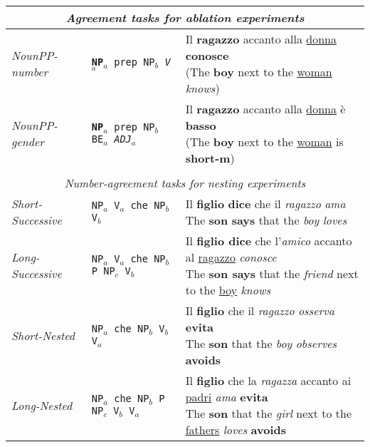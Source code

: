 \begin{table}[ht]
    \setlength\tabcolsep{3mm}
\small
\centering
\begin{tabular}{lll}
\multicolumn{3}{c}{\centering \textit{Agreement tasks for ablation experiments}}\\
\hline
\hline
\emph{NounPP-number} & \texttt{\textbf{NP$_a$} prep NP$_b$ \emph{V$_a$}} & \specialcell{Il \textbf{ragazzo} accanto alla \underline{donna} \textbf{conosce}\vspace{-1mm}\\({\scriptsize The \textbf{boy} next to the \underline{woman} \emph{knows}})} \\
\emph{NounPP-gender} & \texttt{\textbf{NP$_a$} prep NP$_b$ BE$_a$ \emph{ADJ$_a$}} & \specialcell{Il \textbf{ragazzo} accanto alla \underline{donna} \`{e} \textbf{basso}\vspace{-1mm}\\({\scriptsize The \textbf{boy} next to the \underline{woman} is \textbf{short-m}})}\\
\vspace{-2mm}\\
\multicolumn{3}{c}{\centering \textit{Number-agreement tasks for nesting experiments}}\\
\hline
\hline
\emph{Short-Successive} & \texttt{NP$_a$ V$_a$ che NP$_b$ V$_b$} & \specialcell{Il \textbf{figlio} \textbf{dice} che il \emph{ragazzo} \emph{ama}\vspace{-1mm}\\{\scriptsize The \textbf{son} \textbf{says} that the \emph{boy} \emph{loves}}} \\
\emph{Long-Successive} & \texttt{NP$_a$ V$_a$ che NP$_b$ P NP$_c$ V$_b$} & \specialcell{Il \textbf{figlio dice} che l'\emph{amico} accanto al \underline{ragazzo} \emph{conosce}\vspace{-1mm}\\{\scriptsize The \textbf{son says} that the \emph{friend} next to the \underline{boy} \emph{knows}}} \\
\emph{Short-Nested} & \texttt{NP$_a$ che NP$_b$ V$_b$ V$_a$ } & \specialcell{Il \textbf{figlio} che il \emph{ragazzo} \emph{osserva} \textbf{evita}\vspace{-1mm}\\{\scriptsize The \textbf{son} that the \emph{boy} \emph{observes} \textbf{avoids}}} \\
\emph{Long-Nested} & \texttt{NP$_a$ che NP$_b$ P NP$_c$ V$_b$ V$_a$} & \specialcell{Il \textbf{figlio} che la \emph{ragazza} accanto ai \underline{padri} \emph{ama} \textbf{evita}\vspace{-1mm}\\{\scriptsize The \textbf{son} that the \emph{girl} next to the \underline{fathers} \emph{loves} \textbf{avoids}}} \\

\end{tabular}
\end{table}
